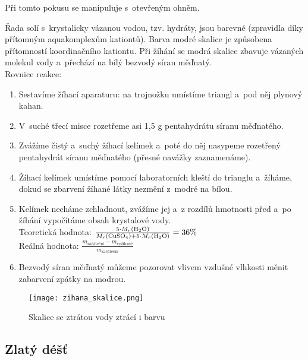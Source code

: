 \hspace{-21pt} 

Při tomto pokusu se manipuluje s~otevřeným ohněm.\\

\hspace{-21pt} 

Řada solí s~krystalicky vázanou vodou, tzv. hydráty, jsou barevné (zpravidla díky přítomným aquakomplexům kationtů). Barva modré skalice je způsobena přítomností koordinačního kationtu. Při žíhání se modrá skalice zbavuje vázaných molekul vody a~přechází na bílý bezvodý síran měďnatý.\\

Rovnice reakce: \\

\hspace{-21pt} 

\begin{enumerate}
  \item Sestavíme žíhací aparaturu: na trojnožku umístíme triangl a~pod něj plynový kahan.
  \item V~suché třecí misce rozetřeme asi 1,5 g pentahydrátu síranu měďnatého.
  \item Zvážíme čistý a~suchý žíhací kelímek a~poté do něj nasypeme rozetřený pentahydrát síranu měďnatého (přesné navážky zaznamenáme).
  \item Žíhací kelímek umístíme pomocí laboratorních kleští do trianglu a~žíháme, dokud se zbarvení žíhané látky nezmění z~modré na bílou.
  \item Kelímek necháme zchladnout, zvážíme jej a~z rozdílů hmotnosti před a~po žíhání vypočítáme obsah krystalové vody.\\ Teoretická hodnota: $\frac{5 \cdot M_r(\ce{H2O})}{M_r(\ce{CuSO4})+ 5 \cdot M_r(\ce{H2O})} = 36\%$ \\ Reálná hodnota: $\frac{m_{\text{začáteční}} - m_{\text{vyžíhané}}}{m_{\text{začáteční}}}$
  \item Bezvodý síran měďnatý můžeme pozorovat vlivem vzdušné vlhkosti měnit zabarvení zpátky na modrou.
\end{enumerate}

\begin{figure}[h]
    \centering
    \texttt{[image: zihana\_skalice.png]}
    \caption{Skalice se ztrátou vody ztrácí i barvu}
\end{figure}

\subsection{Zlatý déšť}

